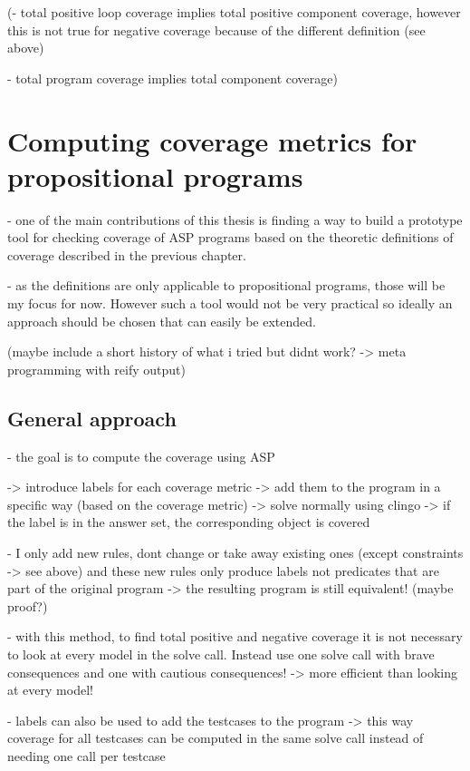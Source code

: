 (- total positive loop coverage implies total positive component coverage, however this is not true for negative coverage because 
of the different definition (see above)

- total program coverage implies total component coverage)

\chapter{Computing coverage metrics for propositional programs}
\label{ch:Computing coverage metrics for propositional programs}
- one of the main contributions of this thesis is finding a way to build a prototype tool for checking coverage of ASP programs 
based on the theoretic definitions of coverage described in the previous chapter.

- as the definitions are only applicable to propositional programs, those will be my focus for now. However such a tool would not 
be very practical so ideally an approach should be chosen that can easily be extended.

(maybe include a short history of what i tried but didnt work? -> meta programming with reify output)

\section{General approach}
\label{sec:Computing coverage metrics for propositional programs/General approach}
- the goal is to compute the coverage using ASP

-> introduce labels for each coverage metric -> add them to the program in a specific way (based on the coverage metric)  -> solve 
normally using clingo -> if the label is in the answer set, the corresponding object is covered

- I only add new rules, dont change or take away existing ones (except constraints -> see above) and these new rules only produce 
labels not predicates that are part of the original program -> the resulting program is still equivalent! (maybe proof?)

- with this method, to find total positive and negative coverage it is not necessary to look at every model in the solve call. 
Instead use one solve call with brave consequences and one with cautious consequences! -> more efficient than looking at every model!

- labels can also be used to add the testcases to the program -> this way coverage for all testcases can be computed in the same solve 
call instead of needing one call per testcase

